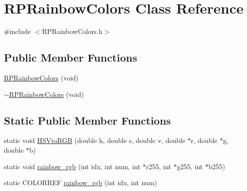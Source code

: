 \hypertarget{classRPRainbowColors}{
\section{RPRainbowColors Class Reference}
\label{classRPRainbowColors}
}


{\ttfamily \#include $<$RPRainbowColors.h$>$}

\subsection*{Public Member Functions}
\begin{DoxyCompactItemize}
\item 
\hyperlink{classRPRainbowColors_a1bc4fbe45d931fda4beb20bfee261f94}{RPRainbowColors} (void)
\item 
\hyperlink{classRPRainbowColors_a6482f9f377d71f811e4c333f3febff32}{$\sim$RPRainbowColors} (void)
\end{DoxyCompactItemize}
\subsection*{Static Public Member Functions}
\begin{DoxyCompactItemize}
\item 
static void \hyperlink{classRPRainbowColors_a87a3c51982997c770c0de8f13b8b5cc3}{HSVtoRGB} (double h, double s, double v, double $\ast$r, double $\ast$g, double $\ast$b)
\item 
static void \hyperlink{classRPRainbowColors_a847f9789e31ec6e1f7f0e542304a1217}{rainbow\_\-rgb} (int idx, int num, int $\ast$r255, int $\ast$g255, int $\ast$b255)
\item 
static COLORREF \hyperlink{classRPRainbowColors_a5703d341ac0fd5ef5ca5204e199a385e}{rainbow\_\-rgb} (int idx, int num)
\end{DoxyCompactItemize}


